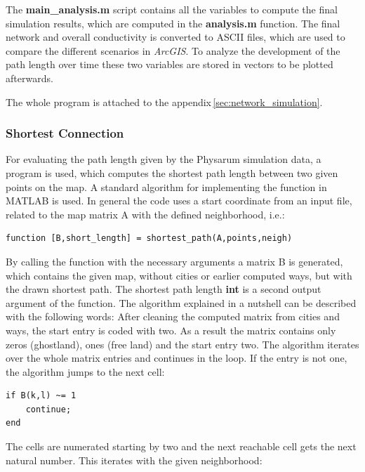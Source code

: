\documentclass[11pt]{scrartcl}
\begin{document}
The \textbf{main\_analysis.m} script contains all the variables to compute the final simulation results, which are computed in the \textbf{analysis.m} function. The final network and overall conductivity is converted to ASCII files, which are used to compare the different scenarios in \textit{ArcGIS}. To analyze the development of the path length over time these two variables are stored in vectors to be plotted afterwards.

The whole program is attached to the appendix\,\ref{sec:network_simulation}.



\subsubsection{Shortest Connection}
\label{sec:shortest_connection}
For evaluating the path length given by the Physarum simulation data, a program is used, which computes the shortest path length between two given points on the map. A standard algorithm \cite{gaertner2010} for implementing the function in MATLAB is used. In general the code uses a start coordinate from an input file, related to the map matrix A with the defined neighborhood, i.e.:

\begin{lstlisting}
function [B,short_length] = shortest_path(A,points,neigh)
\end{lstlisting}

\null

By calling the function with the necessary arguments a matrix B is generated, which contains the given map, without cities or earlier computed ways, but with the drawn shortest path. The shortest path length \textbf{int} is a second output argument of the function. The algorithm explained in a nutshell can be described with the following words: After cleaning the computed matrix from cities and ways, the start entry is coded with two. As a result the matrix contains only zeros (ghostland), ones (free land) and the start entry two. The algorithm iterates over the whole matrix entries and continues in the loop. If the entry is not one, the algorithm jumps to the next cell:

\begin{lstlisting}
if B(k,l) ~= 1
	continue;
end
\end{lstlisting}

\null

The cells are numerated starting by two and the next reachable cell gets the next natural number. This iterates with the given neighborhood:
\end{document}
